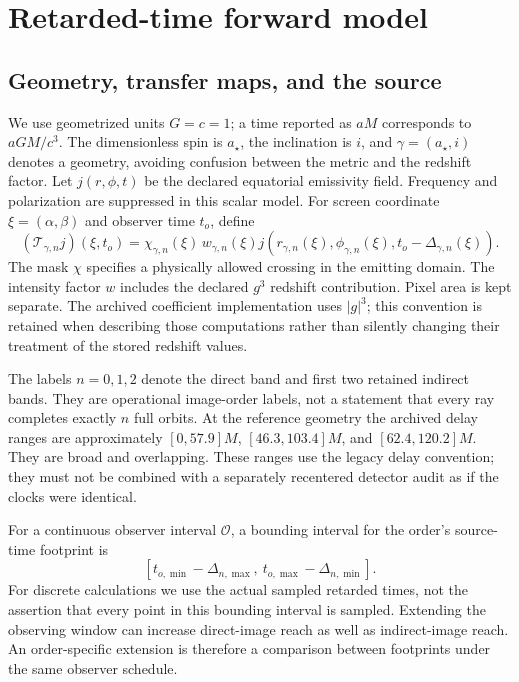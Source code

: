 \section{Retarded-time forward model}\label{sec:forward}
\subsection{Geometry, transfer maps, and the source}
We use geometrized units $G=c=1$; a time reported as $aM$ corresponds to $aGM/c^3$. The dimensionless spin is $a_\star$, the inclination is $i$, and $\gamma=(a_\star,i)$ denotes a geometry, avoiding confusion between the metric and the redshift factor. Let $j(r,\phi,t)$ be the declared equatorial emissivity field. Frequency and polarization are suppressed in this scalar model. For screen coordinate $\xi=(\alpha,\beta)$ and observer time $t_o$, define
\begin{equation}
(\mathcal T_{\gamma,n}j)(\xi,t_o)
=\chi_{\gamma,n}(\xi)\,w_{\gamma,n}(\xi)
 j\!\left(r_{\gamma,n}(\xi),\phi_{\gamma,n}(\xi),t_o-\Delta_{\gamma,n}(\xi)\right).
\label{eq:transfer}
\end{equation}
The mask $\chi$ specifies a physically allowed crossing in the emitting domain. The intensity factor $w$ includes the declared $g^3$ redshift contribution. Pixel area is kept separate. The archived coefficient implementation uses $|g|^3$; this convention is retained when describing those computations rather than silently changing their treatment of the stored redshift values.

The labels $n=0,1,2$ denote the direct band and first two retained indirect bands. They are operational image-order labels, not a statement that every ray completes exactly $n$ full orbits. At the reference geometry the archived delay ranges are approximately $[0,57.9]M$, $[46.3,103.4]M$, and $[62.4,120.2]M$. They are broad and overlapping. These ranges use the legacy delay convention; they must not be combined with a separately recentered detector audit as if the clocks were identical.

For a continuous observer interval $\mathcal O$, a bounding interval for the order's source-time footprint is
\begin{equation}
\left[t_{o,\min}-\Delta_{n,\max},\ t_{o,\max}-\Delta_{n,\min}\right].
\label{eq:boundingfootprint}
\end{equation}
For discrete calculations we use the actual sampled retarded times, not the assertion that every point in this bounding interval is sampled. Extending the observing window can increase direct-image reach as well as indirect-image reach. An order-specific extension is therefore a comparison between footprints under the same observer schedule.

